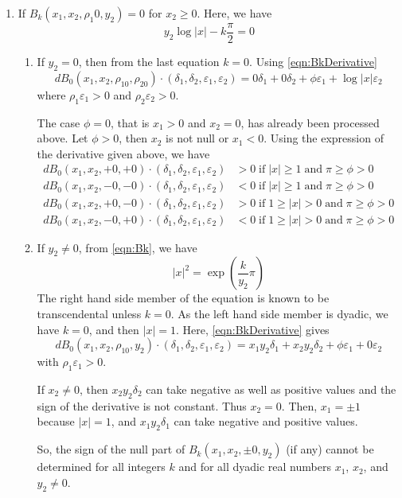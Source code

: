 \documentclass {article}
\renewcommand {\epsilon}{\varepsilon}
\renewcommand {\geq}{\geqslant}
\begin{document}
\begin {enumerate}
\item If $B_k(x_1, x_2, \rho_1 0, y_2)=0$ for $x_2 \geq 0$.
  Here, we have
  \[
  y_2\log|x|-k\frac{\pi}{2} = 0
  \]
  \begin{enumerate}
  \item If $y_2=0$, then from the last equation $k=0$.
    Using \ref {eqn:BkDerivative}
    \[
    dB_0(x_1,x_2,\rho_10,\rho_20)\cdot(\delta_1, \delta_2, \epsilon_1, \epsilon_2) =
    0\delta_1 + 0\delta_2 + \phi \epsilon_1 +\log|x| \epsilon_2
    \]
    where $\rho_1 \epsilon_1 > 0$ and $\rho_2 \epsilon_2 > 0$.

    The case $\phi = 0$, that is $x_1 > 0$ and $x_2 = 0$, has already been
    processed above.
    Let $\phi > 0$, then $x_2$ is not null or $x_1 < 0$.
    Using the expression of the derivative given above, we have
    \begin{align*}
      dB_0(x_1, x_2, +0, +0)\cdot(\delta_1, \delta_2, \epsilon_1, \epsilon_2)
      &> 0 \;\text{if}\; |x| \geq 1 \;\text{and}\; \pi \geq \phi > 0\\
      dB_0(x_1, x_2, -0, -0)\cdot(\delta_1, \delta_2, \epsilon_1, \epsilon_2)
      &< 0 \;\text{if}\; |x| \geq 1 \;\text{and}\; \pi \geq \phi > 0\\
      dB_0(x_1, x_2, +0, -0)\cdot(\delta_1, \delta_2, \epsilon_1, \epsilon_2)
      &> 0 \;\text{if}\; 1 \geq |x| > 0 \;\text{and}\; \pi \geq \phi > 0\\
      dB_0(x_1, x_2, -0, +0)\cdot(\delta_1, \delta_2, \epsilon_1, \epsilon_2)
      &< 0 \;\text{if}\; 1 \geq |x| > 0 \;\text{and}\; \pi \geq \phi > 0
    \end{align*}
  \item If $y_2 \neq 0$, from \ref {eqn:Bk}, we have
    \[
    |x|^2=\exp\left(\frac{k}{y_2}\pi\right)
    \]
    The right hand side member of the equation is known to be transcendental
    unless $k=0$.
    As the left hand side member is dyadic, we have $k=0$, and then $|x|=1$.
    Here, \ref {eqn:BkDerivative} gives
    \[
    dB_0(x_1,x_2,\rho_10,y_2)\cdot(\delta_1, \delta_2, \epsilon_1, \epsilon_2)
    = x_1y_2\delta_1 + x_2y_2\delta_2 + \phi \epsilon_1 + 0\epsilon_2
    \]
    with $\rho_1 \epsilon_1 > 0$.

    If $x_2 \neq 0$, then $x_2y_2\delta_2$ can take negative as well as
    positive values and the sign of the derivative is not constant.
    Thus $x_2 = 0$.
    Then, $x_1=\pm 1$ because $|x|=1$, and $x_1y_2\delta_1$ can take negative
    and positive values.

    So, the sign of the null part of $B_k(x_1, x_2, \pm 0, y_2)$ (if any)
    cannot be determined for all integers $k$ and for all dyadic real numbers
    $x_1$, $x_2$, and $y_2 \neq 0$.
  \end{enumerate}


\end{enumerate}
\end{document}
